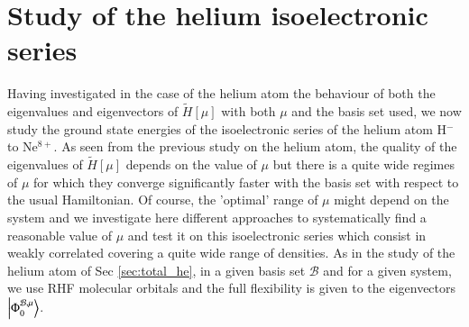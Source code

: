 \documentclass[aip,jcp,reprint,noshowkeys,superscriptaddress]{revtex4-1}
\newcommand{\phimub}[0]{\Phi^{\mathcal{B},\mu}_0}
\newcommand{\basis}[0]{\mathcal{B}}
\begin{document}
\section{Study of the helium isoelectronic series}
\label{sec:iso_elec}
Having investigated in the case of the helium atom the behaviour of both the eigenvalues and eigenvectors of $\tilde{H}[\mu]$ with both $\mu$ and the basis set used, we now study the ground state energies of the isoelectronic series of the helium atom H$^{-}$ to Ne$^{8+}$. As seen from the previous study on the helium atom, the quality of the eigenvalues of $\tilde{H}[\mu]$ depends on the value of $\mu$ but there is a quite wide regimes of $\mu$ for which they converge significantly faster with the basis set with respect to the usual Hamiltonian. Of course, the 'optimal' range of $\mu$ might depend on the system and we investigate here different approaches to systematically find a reasonable value of $\mu$ and test it on this isoelectronic series which consist in weakly correlated covering a quite wide range of densities. 
As in the study of the helium atom of Sec \ref{sec:total_he}, in a given basis set $\basis$ and for a given system, we use RHF molecular orbitals and the full flexibility is given to the eigenvectors $\ket{\phimub}$. 
\end{document}
